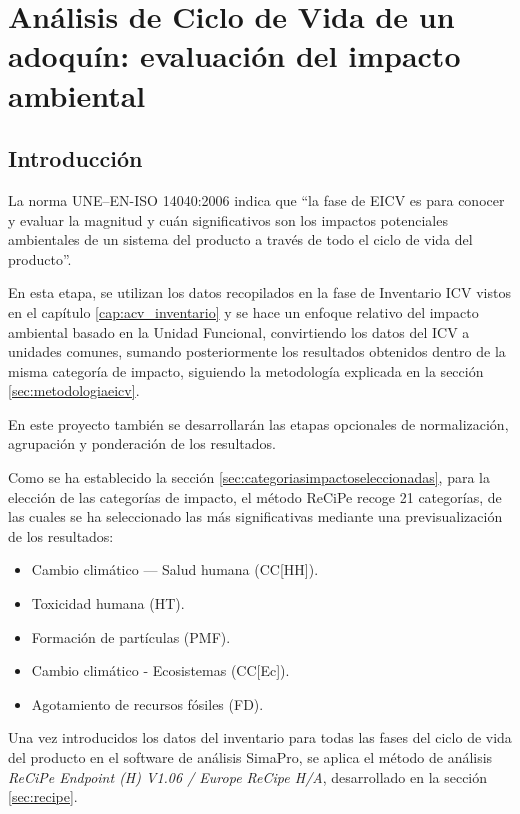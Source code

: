 \chapter{Análisis de Ciclo de Vida de un adoquín: evaluación del impacto ambiental}\label{cap:acv_evaluacion}

\section{Introducción}
La norma UNE–EN-ISO 14040:2006 \cite{iso14040} indica que ``la fase de EICV es para conocer y evaluar la magnitud y cuán significativos son los impactos potenciales ambientales de un sistema del producto a través de todo el ciclo de vida del producto''.

En esta etapa, se utilizan los datos recopilados en la fase de Inventario ICV vistos en el capítulo \ref{cap:acv_inventario} y se hace un enfoque relativo del impacto ambiental basado en la Unidad Funcional, convirtiendo los datos del ICV a unidades comunes, sumando posteriormente los resultados obtenidos dentro de la misma categoría de impacto, siguiendo la metodología explicada en la sección \ref{sec:metodologiaeicv}.

En este proyecto también se desarrollarán las etapas opcionales de normalización, agrupación y ponderación de los resultados.

Como se ha establecido la sección \ref{sec:categoriasimpactoseleccionadas}, para la elección de las categorías de impacto, el método ReCiPe recoge 21 categorías, de las cuales se ha seleccionado las más significativas mediante una previsualización de los resultados:

\begin{itemize}
  \item Cambio climático — Salud humana (CC[HH]).
  \item Toxicidad humana (HT).
  \item Formación de partículas (PMF).
  \item Cambio climático - Ecosistemas (CC[Ec]).
  \item Agotamiento de recursos fósiles (FD).
\end{itemize}

Una vez introducidos los datos del inventario para todas las fases del ciclo de vida del producto en el software de análisis SimaPro, se aplica el método de análisis \textit{ReCiPe Endpoint (H) V1.06 / Europe ReCipe H/A}, desarrollado en la sección \ref{sec:recipe}.

